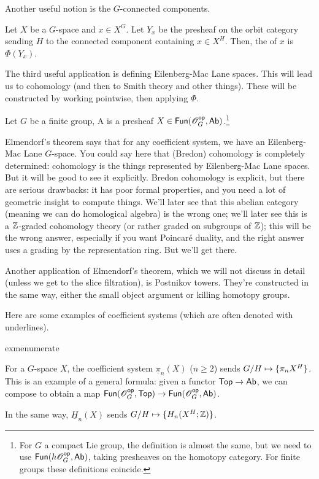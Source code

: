 Another useful notion is the $G$-connected components.
\begin{defn}
Let $X$ be a $G$-space and $x\in X^G$. Let $Y_x$ be the presheaf on the orbit category sending $H$ to the connected
component containing $x\in X^H$. Then, the  of $x$ is $\Phi(Y_x)$.
\end{defn}
The third useful application is defining Eilenberg-Mac Lane spaces. This will lead us to cohomology (and then to
Smith theory and other things). These will be constructed by working pointwise, then applying $\Phi$.
\begin{defn}
Let $G$ be a finite group, A  is a presheaf $X\in\mathsf{Fun}(\mathscr O_G^{\mathsf{op}}, \mathsf{Ab})$.\footnote{For $G$ a
compact Lie group, the definition is almost the same, but we need to use $\mathsf{Fun}(h\mathscr O_G^{\mathsf{op}}, \mathsf{Ab})$, taking presheaves
on the homotopy category. For finite groups these definitions coincide.}
\end{defn}
Elmendorf's theorem says that for any coefficient system, we have an Eilenberg-Mac Lane $G$-space. You could say
here that (Bredon) cohomology is completely determined: cohomology is the things represented by Eilenberg-Mac Lane
spaces. But it will be good to see it explicitly. Bredon cohomology is explicit, but there are serious drawbacks:
it has poor formal properties, and you need a lot of geometric insight to compute things. We'll later see that this
abelian category (meaning we can do homological algebra) is the wrong one; we'll later see this is a $\mathbb Z$-graded
cohomology theory (or rather graded on subgroups of $\mathbb Z$); this will be the wrong answer, especially if you want
Poincaré duality, and the right answer uses a grading by the representation ring. But we'll get there.
\begin{rem}
Another application of Elmendorf's theorem, which we will not discuss in detail (unless we get to the slice
filtration), is Postnikov towers. They're constructed in the same way, either the small object argument or killing
homotopy groups.
\end{rem}
Here are some examples of coefficient systems (which are often denoted with underlines).
\begin{comp}{exm}{enumerate}
	\item For a $G$-space $X$, the coefficient system $\underline\pi_n(X)$ ($n\ge 2$) sends $G/H\mapsto\set{\pi_nX^H}$. This is an example of
	a general formula: given a functor $\mathsf{Top}\to\mathsf{Ab}$, we can compose to obtain a map $\mathsf{Fun}(\mathscr O_G^{\mathsf{op}},
	\mathsf{Top})\to\mathsf{Fun}(\mathscr O_G^{\mathsf{op}}, \mathsf{Ab})$.
	\item In the same way, $\underline H_n(X)$ sends $G/H\mapsto\set{H_n(X^H;\Z)}$.\qedhere
\end{comp}
